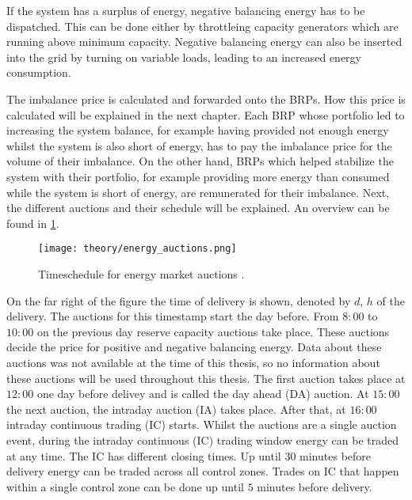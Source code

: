\documentclass[class=scrbook, crop=false]{standalone}
\begin{document}
If the system has a surplus of energy, negative balancing energy has to be dispatched. This can be done either by throttleing capacity generators which are running above minimum capacity. Negative balancing energy can also be inserted into the grid by turning on variable loads, leading to an increased energy consumption.

The imbalance price is calculated and forwarded onto the BRPs. 
How this price is calculated will be explained in the next chapter.
Each BRP whose portfolio led to increasing the system balance, for example having provided not enough energy whilst the system is also short of energy, has to pay the imbalance price for the volume of their imbalance. 
On the other hand, BRPs which helped stabilize the system with their portfolio, for example providing more energy than consumed while the system is short of energy, are remunerated for their imbalance. 
Next, the different auctions and their schedule will be explained. An overview can be found in \ref{fig::energy_auctions}. 

\begin{figure}[ht]
            \centering
            \texttt{[image: theory/energy\_auctions.png]}
            \caption[Timeschedule for energy market auctions]{Timeschedule for energy market auctions \cite{narajewskiProbabilisticForecastingGerman2022}.}
            \label{fig::energy_auctions}
 \end{figure}
 
On the far right of the figure the time of delivery is shown, denoted by $d$, $h$ of the delivery. The auctions for this timestamp start the day before. From $8:00$ to $10:00$ on the previous day reserve capacity auctions take place. These auctions decide the price for positive and negative balancing energy.
Data about these auctions was not available at the time of this thesis, so no information about these auctions will be used throughout this thesis.
The first auction takes place at $12:00$ one day before delivey and is called the day ahead (DA) auction. At $15:00$ the next auction, the intraday auction (IA) takes place. After that, at $16:00$ intraday continuous trading (IC) starts. Whilst the auctions are a single auction event, during the intraday continuous (IC) trading window energy can be traded at any time. The IC has different closing times. Up until $30$ minutes before delivery energy can be traded across all control zones. Trades on IC that happen within a single control zone can be done up until $5$ minutes before delivery.
\end{document}
